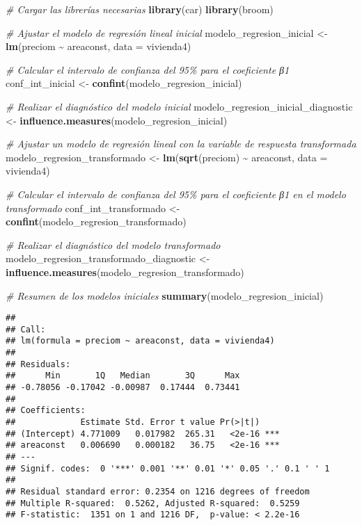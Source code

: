 \documentclass[
]{article}
\newenvironment{Shaded}{\begin{snugshade}}{\end{snugshade}}
\newcommand{\AttributeTok}[1]{\textcolor[rgb]{0.13,0.29,0.53}{#1}}
\newcommand{\CommentTok}[1]{\textcolor[rgb]{0.56,0.35,0.01}{\textit{#1}}}
\newcommand{\FunctionTok}[1]{\textcolor[rgb]{0.13,0.29,0.53}{\textbf{#1}}}
\newcommand{\NormalTok}[1]{#1}
\newcommand{\OtherTok}[1]{\textcolor[rgb]{0.56,0.35,0.01}{#1}}
\newcommand{\SpecialCharTok}[1]{\textcolor[rgb]{0.81,0.36,0.00}{\textbf{#1}}}
\begin{document}
\begin{Shaded}
\begin{Highlighting}[]
\CommentTok{\# Cargar las librerías necesarias}
\FunctionTok{library}\NormalTok{(car)}
\FunctionTok{library}\NormalTok{(broom)}

\CommentTok{\# Ajustar el modelo de regresión lineal inicial}
\NormalTok{modelo\_regresion\_inicial }\OtherTok{\textless{}{-}} \FunctionTok{lm}\NormalTok{(preciom }\SpecialCharTok{\textasciitilde{}}\NormalTok{ areaconst, }\AttributeTok{data =}\NormalTok{ vivienda4)}

\CommentTok{\# Calcular el intervalo de confianza del 95\% para el coeficiente β1}
\NormalTok{conf\_int\_inicial }\OtherTok{\textless{}{-}} \FunctionTok{confint}\NormalTok{(modelo\_regresion\_inicial)}

\CommentTok{\# Realizar el diagnóstico del modelo inicial}
\NormalTok{modelo\_regresion\_inicial\_diagnostic }\OtherTok{\textless{}{-}} \FunctionTok{influence.measures}\NormalTok{(modelo\_regresion\_inicial)}

\CommentTok{\# Ajustar un modelo de regresión lineal con la variable de respuesta transformada}
\NormalTok{modelo\_regresion\_transformado }\OtherTok{\textless{}{-}} \FunctionTok{lm}\NormalTok{(}\FunctionTok{sqrt}\NormalTok{(preciom) }\SpecialCharTok{\textasciitilde{}}\NormalTok{ areaconst, }\AttributeTok{data =}\NormalTok{ vivienda4)}

\CommentTok{\# Calcular el intervalo de confianza del 95\% para el coeficiente β1 en el modelo transformado}
\NormalTok{conf\_int\_transformado }\OtherTok{\textless{}{-}} \FunctionTok{confint}\NormalTok{(modelo\_regresion\_transformado)}

\CommentTok{\# Realizar el diagnóstico del modelo transformado}
\NormalTok{modelo\_regresion\_transformado\_diagnostic }\OtherTok{\textless{}{-}} \FunctionTok{influence.measures}\NormalTok{(modelo\_regresion\_transformado)}

\CommentTok{\# Resumen de los modelos iniciales}
\FunctionTok{summary}\NormalTok{(modelo\_regresion\_inicial)}
\end{Highlighting}
\end{Shaded}

\begin{verbatim}
## 
## Call:
## lm(formula = preciom ~ areaconst, data = vivienda4)
## 
## Residuals:
##      Min       1Q   Median       3Q      Max 
## -0.78056 -0.17042 -0.00987  0.17444  0.73441 
## 
## Coefficients:
##             Estimate Std. Error t value Pr(>|t|)    
## (Intercept) 4.771009   0.017982  265.31   <2e-16 ***
## areaconst   0.006690   0.000182   36.75   <2e-16 ***
## ---
## Signif. codes:  0 '***' 0.001 '**' 0.01 '*' 0.05 '.' 0.1 ' ' 1
## 
## Residual standard error: 0.2354 on 1216 degrees of freedom
## Multiple R-squared:  0.5262, Adjusted R-squared:  0.5259 
## F-statistic:  1351 on 1 and 1216 DF,  p-value: < 2.2e-16
\end{verbatim}
\end{document}
